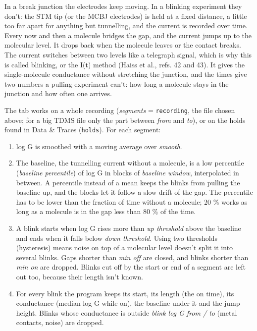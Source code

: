 \documentclass[
  11pt,
  a4paper,
]{article}
\providecommand{\tightlist}{%
  \setlength{\itemsep}{0pt}\setlength{\parskip}{0pt}}
\begin{document}
In a break junction the electrodes keep moving. In a blinking experiment
they don't: the STM tip (or the MCBJ electrodes) is held at a fixed
distance, a little too far apart for anything but tunnelling, and the
current is recorded over time. Every now and then a molecule bridges the
gap, and the current jumps up to the molecular level. It drops back when
the molecule leaves or the contact breaks. The current switches between
two levels like a telegraph signal, which is why this is called
blinking, or the I(t) method (Haiss et al., refs. 42 and 43). It gives
the single-molecule conductance without stretching the junction, and the
times give two numbers a pulling experiment can't: how long a molecule
stays in the junction and how often one arrives.

The tab works on a whole recording (\emph{segments} =
\texttt{recording}, the file chosen above; for a big TDMS file only the
part between \emph{from} and \emph{to}), or on the holds found in Data
\& Traces (\texttt{holds}). For each segment:

\begin{enumerate}
\def\labelenumi{\arabic{enumi}.}
\tightlist
\item
  log G is smoothed with a moving average over \emph{smooth}.
\item
  The baseline, the tunnelling current without a molecule, is a low
  percentile (\emph{baseline percentile}) of log G in blocks of
  \emph{baseline window}, interpolated in between. A percentile instead
  of a mean keeps the blinks from pulling the baseline up, and the
  blocks let it follow a slow drift of the gap. The percentile has to be
  lower than the fraction of time without a molecule; 20 \% works as
  long as a molecule is in the gap less than 80 \% of the time.
\item
  A blink starts when log G rises more than \emph{up threshold} above
  the baseline and ends when it falls below \emph{down threshold}. Using
  two thresholds (hysteresis) means noise on top of a molecular level
  doesn't split it into several blinks. Gaps shorter than \emph{min off}
  are closed, and blinks shorter than \emph{min on} are dropped. Blinks
  cut off by the start or end of a segment are left out too, because
  their length isn't known.
\item
  For every blink the program keeps its start, its length (the on time),
  its conductance (median log G while on), the baseline under it and the
  jump height. Blinks whose conductance is outside \emph{blink log G
  from / to} (metal contacts, noise) are dropped.
\end{enumerate}
\end{document}
